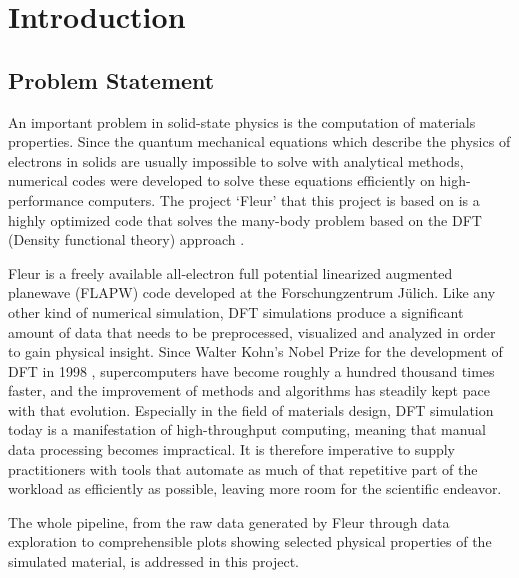 
\chapter{Introduction}
\label{chap:intro}

\section{Problem Statement}
\label{sec:problem-statement}

An important problem in solid-state physics is the computation of materials properties. Since the quantum mechanical equations which describe the physics of electrons in solids are usually impossible to solve with analytical methods, numerical codes were developed to solve these equations efficiently on high-performance computers. The project `Fleur' that this project is based on is a highly optimized code that solves the many-body problem based on the DFT (Density functional theory) approach \cite{fleur}.

Fleur is a freely available all-electron full potential linearized augmented planewave (FLAPW) code developed at the Forschungzentrum Jülich. Like any other kind of numerical simulation, DFT simulations produce a significant amount of data that needs to be preprocessed, visualized and analyzed in order to gain physical insight. Since Walter Kohn's Nobel Prize for the development of DFT in 1998 \cite{kohn-nobel}, supercomputers have become roughly a hundred thousand times faster\cite{top500}, and the improvement of methods and algorithms has steadily kept pace with that evolution. Especially in the field of materials design, DFT simulation today is a manifestation of high-throughput computing, meaning that manual data processing becomes impractical. It is therefore imperative to supply practitioners with tools that automate as much of that repetitive part of the workload as efficiently as possible, leaving more room for the scientific endeavor.

The whole pipeline, from the raw data generated by Fleur through data exploration to comprehensible plots showing selected physical properties of the simulated material, is addressed in this project.



